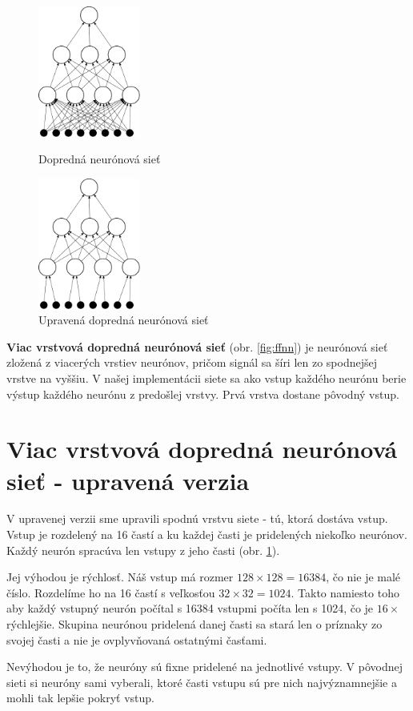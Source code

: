 \begin{figure}
  \begin{center}
    \includegraphics[width=0.3\textwidth]{images/ffnn}
  \end{center}
  \caption{Dopredná neurónová sieť}
  \label{fig:ffnn}
  \begin{center}
    \includegraphics[width=0.3\textwidth]{images/dffnn}
  \end{center}
  \caption{Upravená dopredná neurónová sieť}
  \label{fig:dffnn}
\end{figure}


\textbf{Viac vrstvová dopredná neurónová sieť} (obr. \ref{fig:ffnn}) je neurónová sieť zložená z viacerých vrstiev neurónov, pričom signál sa šíri len zo spodnejšej vrstve na vyššiu. V našej implementácii siete sa ako vstup každého neurónu berie výstup každého neurónu z predošlej vrstvy. Prvá vrstva dostane pôvodný vstup. 

\section{Viac vrstvová dopredná neurónová sieť - upravená verzia}

V upravenej verzii sme upravili spodnú vrstvu siete - tú, ktorá dostáva vstup. Vstup je rozdelený na 16 častí a ku každej časti je pridelených niekoľko neurónov. Každý neurón spracúva len vstupy z jeho časti (obr. \ref{fig:dffnn}). 

Jej výhodou je rýchlosť. Náš vstup má rozmer $128\times 128 = 16384$, čo nie je malé číslo. Rozdelíme ho na 16 častí s veľkosťou $32\times 32 = 1024$. Takto namiesto toho aby každý vstupný neurón počítal s 16384 vstupmi počíta len s 1024, čo je $16\times$ rýchlejšie. Skupina neurónou pridelená danej časti sa stará len o príznaky zo svojej časti a nie je ovplyvňovaná ostatnými časťami. 

Nevýhodou je to, že neuróny sú fixne pridelené na jednotlivé vstupy. V pôvodnej sieti si neuróny sami vyberali, ktoré časti vstupu sú pre nich najvýznamnejšie a mohli tak lepšie pokryť vstup.
